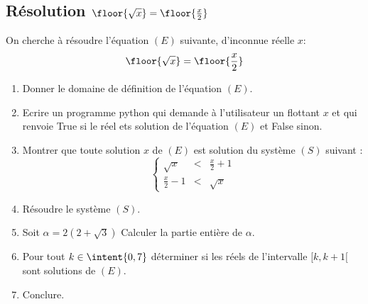 

\subsection{Résolution $\floor{\sqrt{x}} = \floor{ \frac{x}{2}}$}

\begin{exercice}
On cherche à résoudre l'équation $(E)$ suivante, d'inconnue réelle $x$: 
$$\floor{\sqrt{x}} = \floor{ \frac{x}{2}}$$
\begin{enumerate}
\item Donner le domaine de définition de  l'équation $(E)$. 
\item Ecrire un programme python qui demande à l'utilisateur un flottant $x$ et qui renvoie True si le réel ets solution de l'équation $(E)$  et False sinon. 
\item Montrer que toute solution $x$  de $(E)$ est solution du système $(S)$ suivant : 
$$\left\{ 
\begin{array}{ccc}
\sqrt{x}&<& \frac{x}{2}+1\\
\frac{x}{2}-1&<& \sqrt{x}
\end{array}
\right. $$
\item Résoudre le système $(S)$. 
\item Soit $\alpha = 2(2+\sqrt{3})$ Calculer la partie entière de $\alpha$. 
\item Pour tout $k\in \intent{0,7} $ déterminer si les réels de l'intervalle $[k,k+1[$ sont solutions de $(E)$. 
\item Conclure.  
\end{enumerate}
\end{exercice}
